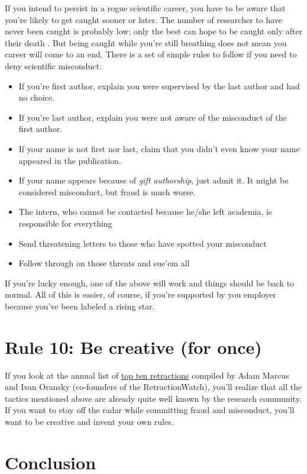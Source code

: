 \documentclass[a4paper,10pt,onecolumn]{article}
\begin{document}
If you intend to persist in a rogue scientific career, you have to be aware that
you're likely to get caught sooner or later. The number of researcher to have never been caught is probably low; only the best can hope to be caught only after their death
\citep{degroote:2016}. But being caught while you're still breathing does not mean you career will come to
an end. There is a set of simple rules to follow if you need to deny scientific misconduct:
\begin{itemize}
  \item If you're first author, explain you were supervised by the last author and
    had no choice.
  \item If you're last author, explain you were not aware of the misconduct of
    the first author.
  \item If your name is not first nor last, claim that you didn't even know your
    name appeared in the publication.
  \item If your name appears because of {\em gift authorship}, just admit it.
    It might be considered misconduct, but fraud is much worse.
  \item The intern, who cannot be contacted because he/she left academia, is
    responsible for everything
  \item Send threatening letters to those who have spotted your misconduct
  \item Follow through on those threats and sue'em all
\end{itemize}
If you're lucky enough, one of the above will work and things should be back to
normal. All of this is easier, of course, if you're supported by you employer because you've been
labeled a rising star.

\section*{Rule 10: Be creative (for once)}

If you look at the annual list of
\href{http://www.the-scientist.com/?articles.view/articleNo/47813/title/Top-10-Retractions-of-2016/}{top
  ten retractions} compiled by Adam Marcus and Ivan Oransky (co-founders of the
RetractionWatch), you'll realize that all the tactics mentioned above are
already quite well known by the research community. If you want to stay off the radar
while committing fraud and misconduct, you'll want to be creative and invent
your own rules. 

\section*{Conclusion}
\end{document}

